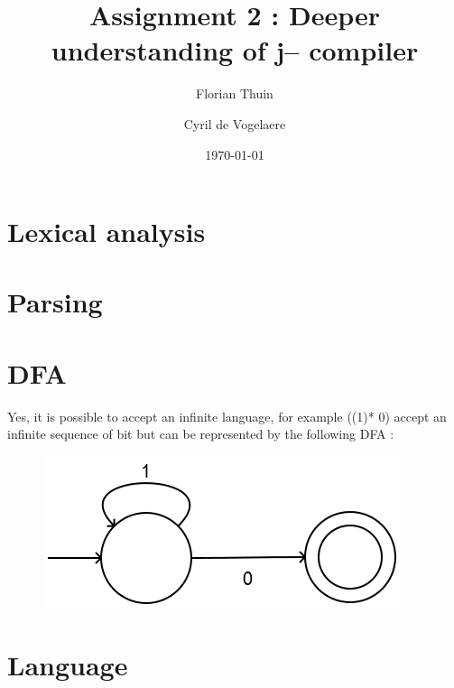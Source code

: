 \documentclass[a4paper, 11pt]{article}
\author{Florian Thuin \and Cyril de Vogelaere}
\date{\today}
\title{Assignment 2 : Deeper understanding of j-- compiler}
\begin{document}
    \maketitle
    \tableofcontents
    \section{Lexical analysis}
    \section{Parsing}
    \section{DFA}
    	Yes, it is possible to accept an infinite language, for example
    	((1)* 0) accept an infinite sequence of bit but can be 
    	represented by the following DFA :
    	
    	\begin{figure}[!h]
    		\center
    		\includegraphics[scale=0.5]{DFAQ3.png}
    	\end{figure}
    	
    \section{Language}
\end{document}
